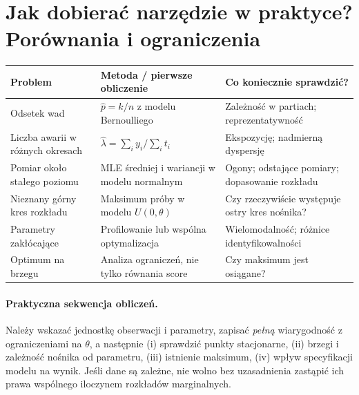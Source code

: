 \section{Jak dobierać narzędzie w praktyce? Porównania i ograniczenia}
\begin{center}\small
\begin{tabular}{>{\raggedright\arraybackslash}p{}>{\raggedright\arraybackslash}p{}>{\raggedright\arraybackslash}p{}}
\toprule
\textbf{Problem} & \textbf{Metoda / pierwsze obliczenie} & \textbf{Co koniecznie sprawdzić?}\\
\midrule
Odsetek wad & $\widehat p=k/n$ z modelu Bernoulliego & Zależność w partiach; reprezentatywność\\
Liczba awarii w różnych okresach & $\widehat\lambda=\sum_i y_i/\sum_i t_i$ & Ekspozycję; nadmierną dyspersję\\
Pomiar około stałego poziomu & MLE średniej i wariancji w modelu normalnym & Ogony; odstające pomiary; dopasowanie rozkładu\\
Nieznany górny kres rozkładu & Maksimum próby w modelu $U(0,\theta)$ & Czy rzeczywiście występuje ostry kres nośnika?\\
Parametry zakłócające & Profilowanie lub wspólna optymalizacja & Wielomodalność; różnice identyfikowalności\\
Optimum na brzegu & Analiza ograniczeń, nie tylko równania score & Czy maksimum jest osiągane?\\
\bottomrule
\end{tabular}
\end{center}

\paragraph{Praktyczna sekwencja obliczeń.}
Należy wskazać jednostkę obserwacji i parametry, zapisać \emph{pełną}
wiarygodność z ograniczeniami na $\theta$, a następnie (i) sprawdzić
punkty stacjonarne, (ii) brzegi i zależność nośnika od parametru,
(iii) istnienie maksimum, (iv) wpływ specyfikacji modelu na wynik.
Jeśli dane są zależne, nie wolno bez uzasadnienia zastąpić ich prawa
wspólnego iloczynem rozkładów marginalnych.

